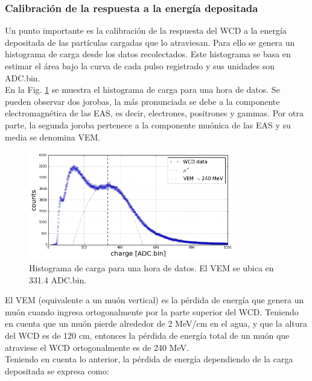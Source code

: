 \subsubsection{Calibración de la respuesta a la energía depositada}

Un punto importante es la calibración de la respuesta del WCD a la energía depositada de las partículas cargadas que lo atraviesan. Para ello se genera un histograma de carga desde los datos recolectados. Este histograma se basa en estimar el área bajo la curva de cada pulso registrado y sus unidades son ADC.bin.\\

En la Fig. \ref{ChargeHis} se muestra el histograma de carga para una hora de datos. Se pueden observar dos jorobas, la más pronunciada se debe a la componente electromagnética de las EAS, es decir, electrones, positrones y gammas. Por otra parte, la segunda joroba pertenece a la componente muónica de las EAS y su media se denomina VEM.\\

\begin{figure}[h!]
\begin{center}
\includegraphics[width=0.8\textwidth]{Figures/dEdxCal}
\caption{Histograma de carga para una hora de datos. El VEM se ubica en 331.4 ADC.bin.}
\label{ChargeHis}
\end{center}
\end{figure}

El VEM (equivalente a un muón vertical) es la pérdida de energía que genera un muón cuando ingresa ortogonalmente por la parte superior del WCD. Teniendo en cuenta que un muón pierde alrededor de 2 MeV/cm en el agua, y que la altura del WCD es de 120 cm, entonces la pérdida de energía total de un muón que atraviese el WCD ortogonalmente es de 240 MeV.\\

Teniendo en cuenta lo anterior, la pérdida de energía dependiendo de la carga depositada se expresa como:

